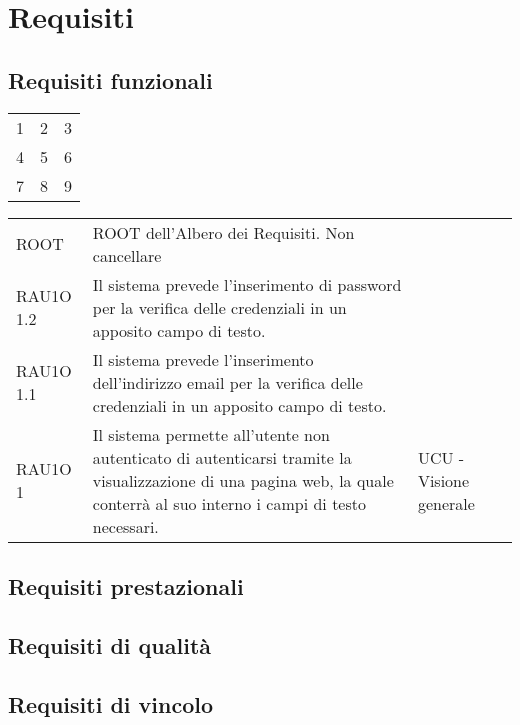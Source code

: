 \section{Requisiti }

\subsection{Requisiti funzionali }

\begin{tabular}{ l | c | r }
  1 & 2 & 3 \\
  4 & 5 & 6 \\
  7 & 8 & 9 \\
\end{tabular}

\begin{tabular}{ l | l | l }
ROOT & ROOT dell'Albero dei Requisiti. Non cancellare & \\
RAU1O 1.2 & Il sistema prevede l'inserimento di password per la verifica delle credenziali in un apposito campo di testo. & \\
RAU1O 1.1 & Il sistema prevede l'inserimento dell'indirizzo email per la verifica delle credenziali in un apposito campo di testo. & \\
RAU1O 1 & Il sistema permette all'utente non autenticato di autenticarsi tramite la visualizzazione di una pagina web, la quale conterrà  al suo interno i campi di testo necessari. & UCU - Visione generale\ \\
\end{tabular}

\subsection{Requisiti prestazionali }
\subsection{Requisiti di qualità }
\subsection{Requisiti di vincolo }